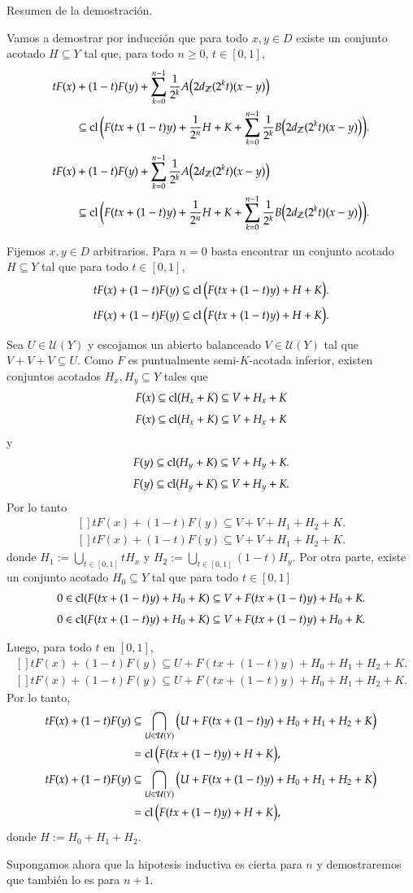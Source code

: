 \documentclass[notheorems,envcountsect,serif,mathserif,professionalfonts,spanish,10pt]{beamer}
\newcommand{\Z}{\mathbb{Z}}
\newcommand{\U}{\mathcal{U}}
\newcommand{\cl}{\mathop{\hbox{\rm cl}}\nolimits}
\theoremstyle{definition}
\def\Eq#1#2{\ifthenelse{\equal{#1}{*}}
  {\begin{equation*}\begin{aligned}[]#2\end{aligned}\end{equation*}}
  {\begin{equation}\begin{aligned}[]\label{E#1}#2\end{aligned}\end{equation}}}
\begin{document}
\begin{frame}[allowframebreaks]{Resumen de la demostración.}
	
	\begin{block}{}	
	Vamos a demostrar por inducción que para todo $x,y\in D$
	existe un conjunto acotado $H\subseteq Y$ tal que, para todo $n\geq 0$, $t\in[0,1]$, 
	\Eq{*}{
	tF(x)&+(1-t)F(y) + \sum_{k=0}^{n-1}{\dfrac{1}{2^k}A\big(2 d_{\Z}(2^k t)(x-y)\big)} \\
	&\subseteq \cl\bigg(F(tx+(1-t)y) + \dfrac{1}{2^n} H + K +
		\sum_{k=0}^{n-1}{\dfrac{1}{2^k}B\big(2 d_{\Z}(2^k t)(x-y)\big)}\bigg). 
	}
	\end{block}
	\begin{block}{}
	Fijemos $x,y\in D$ arbitrarios.
	Para $n=0$ basta encontrar un conjunto acotado $H\subseteq Y$ tal que para todo
	$t\in[0,1]$, 
	\Eq{*}{
		tF(x)+(1-t)F(y)\subseteq \cl\big(F(tx+(1-t)y) + H + K\big).
	}
	\end{block}
	
	\begin{block}{}
	Sea $U\in\U(Y)$ y escojamos un abierto balanceado $V\in\U(Y)$ tal que $V+V+V\subseteq U$.
	Como $F$ es puntualmente semi-$K$-acotada inferior, existen conjuntos acotados $H_x,H_y\subseteq Y$
	tales que 
	\Eq{*}{
	F(x) \subseteq \cl(H_x + K)\subseteq V+H_x+K
	}
	y
	\Eq{*}{
	F(y) \subseteq \cl(H_y + K) \subseteq V+H_y + K.
	} 
	Por lo tanto
	\Eq{*}{
	tF(x)+(1-t)F(y)\subseteq V + V + H_1 + H_2 + K.
	}
	donde $H_1:=\bigcup_{t\in[0,1]} tH_x$ y $H_2:=\bigcup_{t\in[0,1]} (1-t)H_y.$	
	Por otra parte, 
	existe un conjunto acotado $H_0\subseteq Y$ 
	tal que para todo $t\in[0,1]$
	\Eq{*}{
	0\in \cl(F(tx+(1-t)y) + H_0 + K)\subseteq V + F(tx+(1-t)y) + H_0 + K.
	}
	\end{block}
	
	\begin{block}{}
	Luego, para todo $t$ en $[0,1]$, 
	\Eq{*}{
	tF(x)+(1-t)F(y)\subseteq U + F(tx+(1-t)y) + H_0 + H_1 + H_2 + K.
	} 
	Por lo tanto,
	\Eq{*}{
	tF(x)+(1-t)F(y)&\subseteq \bigcap_{U\in\U(Y)}\big(U + F(tx+(1-t)y) + H_0 + H_1 + H_2 + K\big)\\
									&=\cl\big(F(tx+(1-t)y) + H + K\big),
	}
	donde $H:=H_0 + H_1 + H_2.$
	
	Supongamos ahora que la hipotesis inductiva es cierta para $n$ y demostraremos
	que también lo es para $n+1$.
	\end{block}
	

\end{frame}
\end{document}
